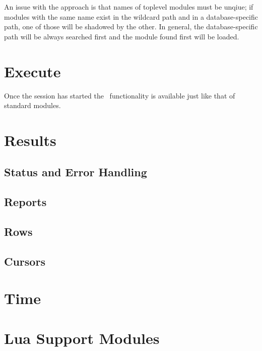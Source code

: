 An issue with the approach is that names
of toplevel modules must be unqiue;
if modules with the same name exist
in the wildcard path and in a database-specific path,
one of those will be shadowed by the other.
In general, the database-specific path will be always
searched first and the module found first will be
loaded.


\section{Execute}
Once the session has started the \nowdb\ functionality
is available just like that of standard modules.

\section{Results}
\subsection{Status and Error Handling}
\subsection{Reports}
\subsection{Rows}
\subsection{Cursors}

\section{Time}

\section{Lua Support Modules}
